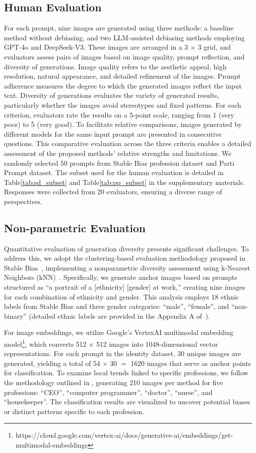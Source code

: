 \subsection{Human Evaluation}
For each prompt, nine images are generated using three methods: a baseline method without debiasing, and two LLM-assisted debiasing methods employing GPT-4o and DeepSeek-V3. These images are arranged in a 3 $\times$ 3 grid, and evaluators assess pairs of images based on image quality, prompt reflection, and diversity of generations. Image quality refers to the aesthetic appeal, high resolution, natural appearance, and detailed refinement of the images. Prompt adherence measures the degree to which the generated images reflect the input text. Diversity of generations evaluates the variety of generated results, particularly whether the images avoid stereotypes and fixed patterns. For each criterion, evaluators rate the results on a 5-point scale, ranging from 1 (very poor) to 5 (very good). To facilitate relative comparisons, images generated by different models for the same input prompt are presented in consecutive questions. This comparative evaluation across the three criteria enables a detailed assessment of the proposed methods' relative strengths and limitations. We randomly selected 50 prompts from Stable Bias profession dataset and Parti Prompt dataset. The subset used for the human evaluation is detailed in Table\ref{tab:sd_subset} and Table\ref{tab:pp_subset} in the supplementary materials. Responses were collected from 20 evaluators, ensuring a diverse range of perspectives. 
\subsection{Non-parametric Evaluation}
Quantitative evaluation of generation diversity presents significant challenges. To address this, we adopt the clustering-based evaluation methodology proposed in Stable Bias~\cite{Luccioni_2023}, implementing a nonparametric diversity assessment using k-Nearest Neighbors (kNN)~\cite{fix1985discriminatory}. Specifically, we generate anchor images based on prompts structured as ``a portrait of a [ethnicity] [gender] at work,'' creating nine images for each combination of ethnicity and gender. This analysis employs 18 ethnic labels from Stable Bias and three gender categories: ``male'', ``female'', and ``non-binary'' (detailed ethnic labels are provided in the Appendix A of~\cite{Luccioni_2023}).

For image embeddings, we utilize Google's VertexAI multimodal embedding model\footnote{https://cloud.google.com/vertex-ai/docs/generative-ai/embeddings/get-multimodal-embeddings}, which converts 512 $\times$ 512 images into 1048-dimensional vector representations. For each prompt in the identity dataset, 30 unique images are generated, yielding a total of 54 $\times$ 30 $=$ 1620 images that serve as anchor points for classification. To examine local trends linked to specific professions, we follow the methodology outlined in \cite{naik2023social}, generating 210 images per method for five professions: ``CEO'', ``computer programmer'', ``doctor'', ``nurse'', and ``housekeeper''. The classification results are visualized to uncover potential biases or distinct patterns specific to each profession.

